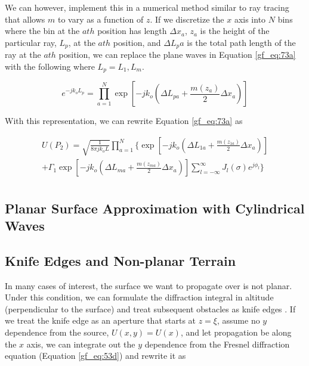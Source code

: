 We can however, implement this in a numerical method similar to ray tracing that allows $m$ to vary as a function of $z$. If we discretize the $x$ axis into $N$ bins where the bin at the $ath$ position has length $\Delta x_a$, $z_a$ is the height of the particular ray, $L_p$, at the $ath$ position, and $\Delta L_pa$ is the total path length of the ray at the $ath$ position, we can replace the plane waves in Equation \ref{gf_eq:73a} with the following where $L_p = L_1, L_m$.

\begin{equation}
e^{-jk_oL_p}=\prod_{a=1}^N \exp\left[-jk_o\left(\Delta L_{pa} +\frac{m(z_a)}{2}\Delta x_a\right)\right]
\label{gf_eq:73z}
\end{equation}
\renewcommand{\baselinestretch}{2} \small\normalsize

\noindent With this representation, we can rewrite Equation \ref{gf_eq:73a} as

\begin{equation}
\begin{gathered}
U(P_2) = \sqrt{\frac{1}{8\pi jk_o L}}\prod_{a=1}^N\bigg\{ \exp\left[-jk_o\left(\Delta L_{1a} +\frac{m(z_{1a})}{2}\Delta x_a\right)\right]\\
+\Gamma_1\exp\left[-jk_o\left(\Delta L_{ma} +\frac{m(z_{ma})}{2}\Delta x_a\right)\right] \sum_{l=-\infty}^{\infty}J_l(\sigma)e^{j\phi_l}\bigg\} \\
\end{gathered}
\label{gf_eq:73za}
\end{equation}
\renewcommand{\baselinestretch}{2} \small\normalsize

\subsection{Planar Surface Approximation with Cylindrical Waves}

\subsection {Knife Edges and Non-planar Terrain}
In many cases of interest, the surface we want to propagate over is not planar. Under this condition, we can formulate the diffraction integral in altitude (perpendicular to the surface) and treat subsequent obstacles as knife edges \cite{whitteker_diffraction}. If we treat the knife edge as an aperture that starts at $z=\xi$, assume no $y$ dependence from the source, $U(x,y) = U(x)$, and let propagation be along the $x$ axis, we can integrate out the $y$ dependence from the Fresnel diffraction equation (Equation \ref{gf_eq:53d}) and rewrite it as 

